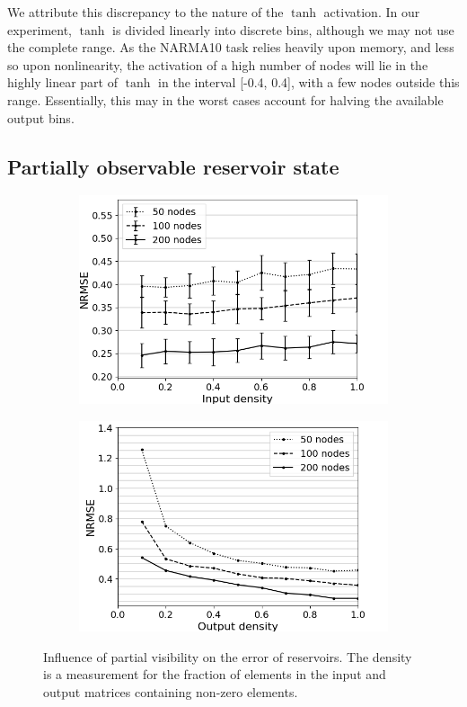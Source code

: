 We attribute this discrepancy to the nature of the $\tanh$ activation. In our
experiment, $\tanh$ is divided linearly into discrete bins, although we may not
use the complete range. As the NARMA10 task relies heavily upon memory, and less
so upon nonlinearity, the activation of a high number of nodes will lie in the
highly linear part of $\tanh$ in the interval [-0.4, 0.4], with a few nodes
outside this range. Essentially, this may in the worst cases account for halving
the available output bins.

\subsection{Partially observable reservoir state}

\begin{figure}[t!]
  \centering
  \begin{subfigure}{.49\textwidth}
    \centering
    \includegraphics[width=1.0\linewidth]{img/input_density_all.png}
    \caption{}
  \end{subfigure}
  \begin{subfigure}{.49\textwidth}
    \centering
    \includegraphics[width=1.0\linewidth]{img/output_density_all.png}
    \caption{}
  \end{subfigure}
  \caption{
    Influence of partial visibility on the error of reservoirs. The density is a
measurement for the fraction of elements in the input and output matrices
containing non-zero elements.
  }
  \label{partial_visibility}
\end{figure}

